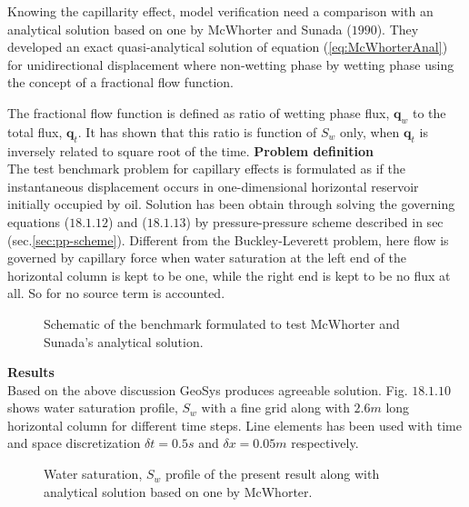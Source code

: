 Knowing  the capillarity effect, model verification need a comparison with an analytical solution based on one by McWhorter and Sunada ($1990$). They developed an exact quasi-analytical solution of equation (\ref{eq:McWhorterAnal}) for unidirectional displacement where non-wetting phase by wetting phase using the concept of a fractional flow function.


The fractional flow function is defined as ratio of wetting phase flux, $\mathbf q_w$ to the total flux, $\mathbf q_t$. It has shown that this ratio is function of $S_w$ only, when $\mathbf q_t$ is inversely related to square root of the time.
\newpage
\textbf{Problem definition}\\
The test benchmark problem for capillary effects is formulated as if the instantaneous displacement occurs in one-dimensional horizontal reservoir initially occupied by oil. Solution has been obtain through solving the governing equations ($18.1.12$) and ($18.1.13$) by pressure-pressure scheme described in sec (sec.\ref{sec:pp-scheme}). Different from the Buckley-Leverett problem, here flow is governed by capillary force when water saturation at the left end of the horizontal column is kept to be one, while the right end is kept to be no flux at all. So for no source term is accounted.
\vspace{-0.3cm}
\begin{figure}[H]
\begin{center}
\end{center}
\vspace{-0.6cm}
\caption{Schematic of the benchmark formulated to test McWhorter and Sunada's analytical solution.}
\label{mcwt:config}
\end{figure}
\vspace{-0.4cm}
\textbf{Results}\\
Based on the above discussion GeoSys produces agreeable solution. Fig. $18.1.10$ shows water saturation profile, $S_w$ with a fine grid along with $2.6m$ long horizontal column for different time steps. Line elements has been used with time and space discretization $\delta t=0.5s$ and $\delta x=0.05m$ respectively.
\begin{figure}[H]
\begin{center}
\end{center}
\vspace{-0.4cm}
\caption{Water saturation, $S_w$ profile of the present result along with analytical solution based on one by McWhorter.}
\label{mcwt:ppModel}
\end{figure}
